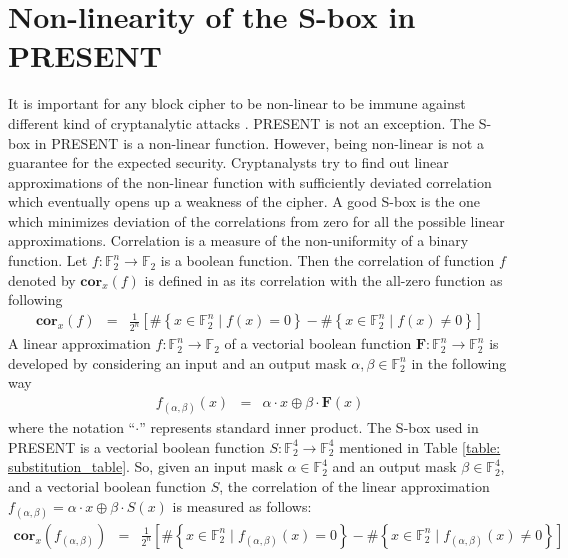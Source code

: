 \section{Non-linearity of the S-box in PRESENT}
It is important for any block cipher to be non-linear to be immune against different kind of cryptanalytic attacks \citep{Celine_Kaisa_non_linear_functions,Kaisa_perfect_non_linear_functions}. PRESENT is not an exception. The S-box in PRESENT is a non-linear function. However, being non-linear is not a guarantee for the expected security. Cryptanalysts try to find out linear approximations of the non-linear function with sufficiently deviated correlation which eventually opens up a weakness of the cipher. A good S-box is the one which minimizes deviation of the correlations from zero for all the possible linear approximations. Correlation is a measure of the non-uniformity of a binary function. Let $f:\mathbb{F}_2^n \rightarrow \mathbb{F}_2$ is a boolean function. Then the correlation of function $f$ denoted by $\mathbf{cor}_x\left(f\right)$ is defined in \citep{Celine_Kaisa_Links_2013} as its correlation with the all-zero function as following 
\begin{eqnarray}
\mathbf{cor}_x\left(f\right) &=& \frac{1}{2^n}\left[\# \left\lbrace x \in \mathbb{F}_2^n \;|\;f\left(x\right) = 0 \right\rbrace - \# \left\lbrace x \in \mathbb{F}_2^n \;|\;f\left(x\right) \neq 0 \right\rbrace \right]
\end{eqnarray}
A linear approximation $f:\mathbb{F}_2^n \rightarrow \mathbb{F}_2$ of a vectorial boolean function $\mathbf{F}:\mathbb{F}_2^n \rightarrow \mathbb{F}_2^n$ is developed by considering an input and an output mask $\alpha,\beta \in \mathbb{F}_2^n$ in the following way
\begin{eqnarray}
f_{\left(\alpha,\beta \right)} \left( x \right) &=& \alpha \cdot x \oplus \beta \cdot \mathbf{F}\left( x \right)
\end{eqnarray} where the notation ``$\cdot$'' represents standard inner product.
The S-box used in PRESENT is a vectorial boolean function $S:\mathbb{F}_2^4 \rightarrow \mathbb{F}_2^4$ mentioned in Table \ref{table: substitution_table}. So, given an input mask $\alpha \in \mathbb{F}_2^4$ and an output mask $\beta \in \mathbb{F}_2^4$, and a vectorial boolean function $S$, the correlation of the linear approximation $f_{\left(\alpha,\beta \right)} = \alpha \cdot x \oplus \beta \cdot S\left(x\right)$ is measured as follows:
\begin{eqnarray*}
\mathbf{cor}_x\left(f_{\left(\alpha,\beta \right)}\right) &=& \frac{1}{2^n}\left[\# \left\lbrace x \in \mathbb{F}_2^n \;|\; f_{\left(\alpha,\beta \right)}\left(x\right) = 0 \right\rbrace - \# \left\lbrace x \in \mathbb{F}_2^n\;|\;f_{\left(\alpha,\beta \right)}\left(x\right) \neq 0 \right\rbrace \right]
\end{eqnarray*}

